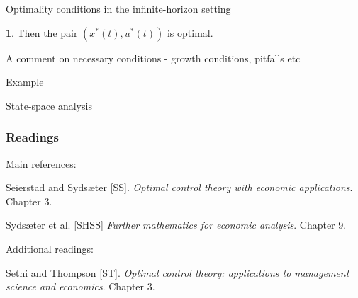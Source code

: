 \documentclass[10pt]{beamer}
\theoremstyle{definition}
\newtheorem{Fact}{\translate{Fact}}
\begin{document}
\begin{section}{Optimality conditions in the infinite-horizon setting}
\begin{frame}[fragile]
\begin{itemize}
\begin{Fact}
Then the pair $ (x^*(t),u^*(t)) $ is optimal.
\label{fc:simpleSC}
\end{Fact}


\end{itemize}
\end{frame}








A comment on necessary conditions - growth conditions, pitfalls etc

Example

State-space analysis

\end{section}

\begin{frame}[fragile]
\frametitle{Readings}
Main references:\bigskip

Seierstad and Syds\ae{}ter [SS]. \emph{Optimal control theory with economic applications}. Chapter 3.

Syds\ae{}ter et al. [SHSS] \emph{Further mathematics for economic analysis}. Chapter 9.\bigskip

Additional readings:

Sethi and Thompson [ST]. \emph{Optimal control theory: applications to management science and economics}. Chapter 3.
\end{frame}
\end{document}
